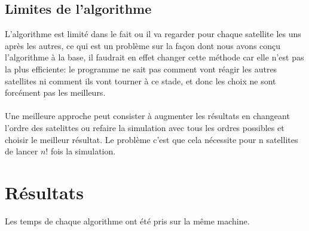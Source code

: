\documentclass[11pt]{article}
\begin{document}
	\subsection{Limites de l'algorithme} %
	\label{sub:limites_de_l_algorithme}

		L'algorithme est limité dans le fait ou il va regarder pour chaque satellite les uns après les autres, ce qui est un problème sur la façon dont nous avons conçu l'algorithme à la base, il faudrait en effet changer cette méthode car elle n'est pas la plus efficiente: le programme ne sait pas comment vont réagir les autres satellites ni comment ils vont tourner à ce stade, et donc les choix ne sont forcément pas les meilleurs.
		\\
		\\
		Une meilleure approche peut consister à augmenter les résultats en changeant l'ordre des satelittes ou refaire la simulation avec tous les ordres possibles et choisir le meilleur résultat. Le problème c'est que cela nécessite pour n satellites de lancer $n!$ fois la simulation.

	\section{Résultats} %
	\label{sec:résultats}
	
	Les temps de chaque algorithme ont été pris sur la même machine.

\end{document}
